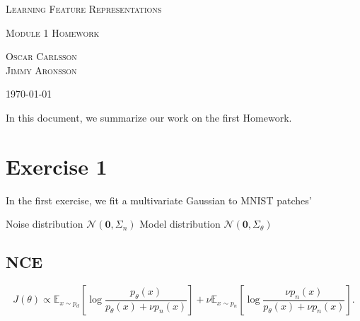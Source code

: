 \documentclass[a4paper]{article}
\theoremstyle{definition}
\theoremstyle{plain}
\begin{document}
{\center\Large\scshape Learning Feature Representations\par}
{\center\large\scshape Module 1 Homework\par}
\vspace{2mm}
{\center\scshape Oscar Carlsson\\Jimmy Aronsson\par}
\vspace{1mm}
{\center\small\scshape \today\par}
\vspace{7mm}

In this document, we summarize our work on the first Homework.

\section*{\center Exercise 1}

In the first exercise, we fit a multivariate Gaussian to MNIST patches'

Noise distribution $\mathcal{N}(\mathbf{0},\Sigma_n)$
Model distribution   $\mathcal{N}(\mathbf{0},\Sigma_\theta)$

\subsection*{NCE}

\lipsum[2] 

\begin{equation}\label{J_function}
J(\theta) \propto \mathbb{E}_{x \sim p_d} \left[ \log \frac{p_\theta(x)}{p_\theta(x) + \nu p_n(x)}\right] + \nu \mathbb{E}_{x \sim p_n} \left[ \log \frac{ \nu p_n(x)}{p_\theta(x) + \nu p_n(x)}\right].
\end{equation}
\end{document}
